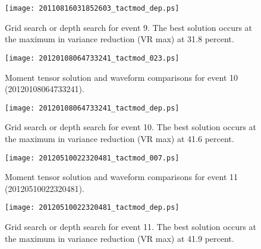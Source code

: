 \documentclass[11pt,titlepage,fleqn]{article}
\begin{document}
\clearpage\pagebreak

\begin{figure}
\centering
\texttt{[image: 20110816031852603\_tactmod\_dep.ps]}
\caption[Depth search solution for event 9]
{{
Grid search or depth search for event 9. The best solution occurs at the maximum in variance reduction (VR max) at 31.8 percent.
\label{fig:20110816031852603_dep}
}}
\end{figure}

\clearpage\pagebreak


\begin{figure}
\centering
\texttt{[image: 20120108064733241\_tactmod\_023.ps]}
\caption[Moment tensor solution for event 10]
{{
Moment tensor solution and waveform comparisons for event 10 (20120108064733241).
\label{fig:20120108064733241}
}}
\end{figure} 

\clearpage\pagebreak

\begin{figure}
\centering
\texttt{[image: 20120108064733241\_tactmod\_dep.ps]}
\caption[Depth search solution for event 10]
{{
Grid search or depth search for event 10. The best solution occurs at the maximum in variance reduction (VR max) at 41.6 percent.
\label{fig:20120108064733241_dep}
}}
\end{figure}

\clearpage\pagebreak

\begin{figure}
\centering
\texttt{[image: 20120510022320481\_tactmod\_007.ps]}
\caption[Moment tensor solution for event 11]
{{
Moment tensor solution and waveform comparisons for event 11 (20120510022320481).
\label{fig:20120510022320481}
}}
\end{figure} 

\clearpage\pagebreak

\begin{figure}
\centering
\texttt{[image: 20120510022320481\_tactmod\_dep.ps]}
\caption[Depth search solution for event 11]
{{
Grid search or depth search for event 11. The best solution occurs at the maximum in variance reduction (VR max) at 41.9 percent.
\label{fig:20120510022320481_dep}
}}
\end{figure}

\clearpage\pagebreak
\end{document}
